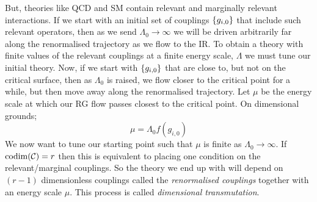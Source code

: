 \paraskip
But, theories like QCD and SM contain relevant and marginally relevant interactions. If we start with an initial set of couplings $\set{g_{i, 0}}$ that include such relevant operators, then as we send $\Lambda_0 \rightarrow \infty$ we will be driven arbitrarily far along the renormalised trajectory as we flow to the IR. To obtain a theory with finite values of the relevant couplings at a finite energy scale, $\Lambda$ we must tune our initial theory. Now, if we start with $\set{g_{i, 0}}$ that are close to, but not on the critical surface, then as $\Lambda_0$ is raised, we flow closer to the critical point for a while, but then move away along the renormalised trajectory. Let $\mu$ be the energy scale at which our RG flow passes closest to the critical point. On dimensional grounds;
\begin{equation}
\mu = \Lambda_0 f(g_{i, 0})
\end{equation}
We now want to tune our starting point such that $\mu$ is finite as $\Lambda_0 \rightarrow \infty$. If $\text{codim}(\mathcal{C}) = r$ then this is equivalent to placing one condition on the relevant/marginal couplings. So the theory we end up with will depend on $(r - 1)$ dimensionless couplings called the \emph{renormalised couplings} together with an energy scale $\mu$. This process is called \emph{dimensional transmutation}.
